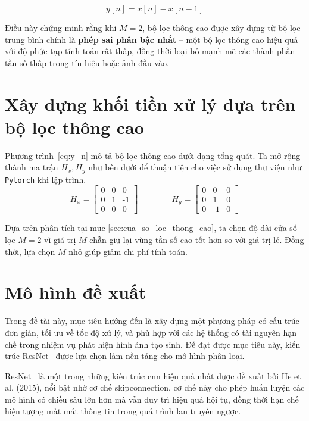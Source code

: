 \begin{equation}
	\label{eq:y_n}
	y[n] = x[n] - x[n-1]
\end{equation}

Điều này chứng minh rằng khi \( M = 2 \), bộ lọc thông cao được xây dựng từ bộ lọc trung bình chính là \textbf{phép sai phân bậc nhất} – một bộ lọc thông cao hiệu quả với độ phức tạp tính toán rất thấp, đồng thời loại bỏ mạnh mẽ các thành phần tần số thấp trong tín hiệu hoặc ảnh đầu vào.

%
\section{Xây dựng khối tiền xử lý dựa trên bộ lọc thông cao}
Phương trình~\eqref{eq:y_n} mô tả bộ lọc thông cao dưới dạng tổng quát. Ta mở rộng thành ma trận $H_x, H_y$ như bên dưới để thuận tiện cho việc sử dụng thư viện như \texttt{Pytorch} khi lập trình.
	\[
	H_x = \begin{bmatrix}
		0 & 0 & 0 \\
		0 & 1 &  \text{-}1 \\
		0 & 0 & 0
	\end{bmatrix} \qquad \qquad
	H_y = \begin{bmatrix}
		0 & 0 & 0 \\
		0 & 1 &  0 \\
		0 & \text{-}1 & 0
	\end{bmatrix}
	\]
	
Dựa trên phân tích tại mục \ref{sec:cua_so_loc_thong_cao}, ta chọn độ dài cửa sổ lọc $M=2$ vì giá trị $M$ chẵn giữ lại vùng tần số cao tốt hơn so với giá trị lẻ. Đồng thời, lựa chọn $M$ nhỏ giúp giảm chi phí tính toán.

\section{Mô hình đề xuất}

Trong đề tài này, mục tiêu hướng đến là xây dựng một phương pháp có cấu trúc đơn giản, tối ưu về tốc độ xử lý, và phù hợp với các hệ thống có tài nguyên hạn chế trong nhiệm vụ phát hiện hình ảnh tạo sinh. Để đạt được mục tiêu này, kiến trúc ResNet~\cite{He2015DeepRL} được lựa chọn làm nền tảng cho mô hình phân loại.

ResNet~\cite{He2015DeepRL} là một trong những kiến trúc \gls{cnn} hiệu quả nhất được đề xuất bởi He et al. (2015), nổi bật nhờ cơ chế \gls{skipconnection}, cơ chế này cho phép huấn luyện các mô hình có chiều sâu lớn hơn mà vẫn duy trì hiệu quả hội tụ, đồng thời hạn chế hiện tượng mất mát thông tin trong quá trình lan truyền ngược.

